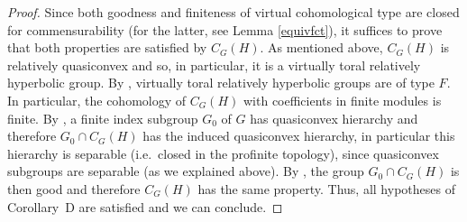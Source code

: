 \documentclass[12pt,twoside]{amsart}
\theoremstyle{definition}
\begin{document}
\begin{proof}
Since both goodness and finiteness of virtual cohomological type are closed for commensurability (for the latter, see Lemma \ref{equivfct}), 
it suffices to prove that both properties are satisfied by $C_G(H)$. As mentioned above, $C_G(H)$ is relatively quasiconvex and so, in particular, it is a 
virtually toral relatively hyperbolic group. By \cite{D}, virtually toral relatively hyperbolic groups are of type $F$. In particular, the cohomology of $C_G(H)$ 
with coefficients in finite modules is finite. By \cite[Theorem 1]{E}, a finite index subgroup $G_0$ of $G$ has quasiconvex hierarchy and therefore 
$G_0\cap C_G(H)$ has the induced quasiconvex hierarchy, in particular this hierarchy is separable (i.e.\ closed in the profinite topology), since 
quasiconvex subgroups are separable (as we explained above). By \cite[Theorem 3.8]{GJZ}, the group $G_0\cap C_G(H)$ is then good 
and therefore $C_G(H)$ has the same property.  Thus, all hypotheses of Corollary~D are satisfied and we can conclude.
\end{proof}
\end{document}
